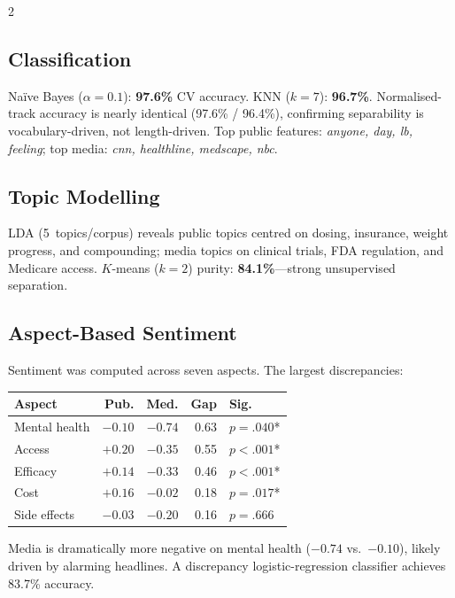 \documentclass[10pt,a4paper]{article}
\begin{document}
\begin{multicols}{2}
\subsection{Classification}

Na\"ive Bayes ($\alpha{=}0.1$): \textbf{97.6\%} CV accuracy.  KNN ($k{=}7$): \textbf{96.7\%}.  Normalised-track accuracy is nearly identical (97.6\% / 96.4\%), confirming separability is vocabulary-driven, not length-driven.  Top public features: \emph{anyone, day, lb, feeling}; top media: \emph{cnn, healthline, medscape, nbc}.

\subsection{Topic Modelling}

LDA (5~topics/corpus) reveals public topics centred on dosing, insurance, weight progress, and compounding; media topics on clinical trials, FDA regulation, and Medicare access.  $K$-means ($k{=}2$) purity: \textbf{84.1\%}---strong unsupervised separation.

\subsection{Aspect-Based Sentiment}

Sentiment was computed across seven aspects.  The largest discrepancies:

\begin{table}[H]
\centering\small
\begin{tabular}{lrrrl}
\toprule
\textbf{Aspect} & \textbf{Pub.} & \textbf{Med.} & \textbf{Gap} & \textbf{Sig.}\\
\midrule
Mental health & $-0.10$ & $-0.74$ & 0.63 & $p{=}.040$*\\
Access & $+0.20$ & $-0.35$ & 0.55 & $p{<}.001$*\\
Efficacy & $+0.14$ & $-0.33$ & 0.46 & $p{<}.001$*\\
Cost & $+0.16$ & $-0.02$ & 0.18 & $p{=}.017$*\\
Side effects & $-0.03$ & $-0.20$ & 0.16 & $p{=}.666$\\
\bottomrule
\end{tabular}
\end{table}
\vspace{-4pt}

Media is dramatically more negative on mental health ($-0.74$ vs.\ $-0.10$), likely driven by alarming headlines.  A discrepancy logistic-regression classifier achieves 83.7\% accuracy.


\end{multicols}
\end{document}
